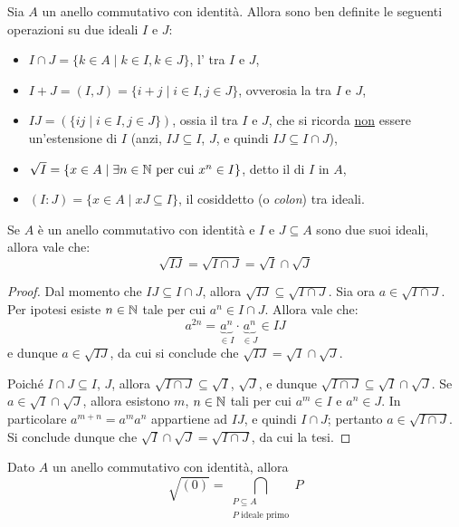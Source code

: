 \documentclass[11pt]{scrartcl}
\begin{document}
	Sia $A$ un anello commutativo con identità. Allora sono ben definite le
	seguenti operazioni su due ideali $I$ e $J$:
	\begin{itemize}
		\item $I\cap J = \{k \in A \mid k \in I, k \in J\}$, l' tra
		$I$ e $J$,
		\item $I + J = (I, J) = \{i + j \mid i \in I, j \in J\}$, ovverosia la  tra $I$ e $J$,
		\item $IJ = (\{ij\mid i \in I, j \in J\})$, ossia il  tra $I$ e $J$, che si ricorda \underline{non} essere
		un'estensione di $I$ (anzi, $IJ \subseteq I$, $J$, e quindi $IJ \subseteq I \cap J$),
		\item $\sqrt{I} = \{x \in A \mid \exists n \in \mathbb N \text{ per cui } x^n \in I\}$,
		detto il  di $I$ in $A$,
		\item $(I : J) = \{x \in A \mid xJ \subseteq I\}$, il cosiddetto  (o \textit{colon}) tra ideali.
	\end{itemize}
	
	\begin{proposition}
		Se $A$ è un anello commutativo con identità e $I$ e $J \subseteq A$ sono due suoi ideali,
		allora vale che:
		\[
		\sqrt{IJ} = \sqrt{I\cap J} = \sqrt{I}\cap \sqrt{J}
		\]
	\end{proposition}
	
	\begin{proof}
		Dal momento che $IJ \subseteq I \cap J$, allora $\sqrt{IJ} \subseteq \sqrt{I \cap J}$. Sia ora $a \in \sqrt{I \cap J}$. Per ipotesi esiste $n \in \mathbb N$ tale
		per cui $a^n \in I \cap J$. Allora vale che:
		\[
		a^{2n} = \underbrace{a^n}_{\in I} \cdot \underbrace{a^n}_{\in J}
		\in IJ
		\]
		e dunque $a \in \sqrt{IJ}$, da cui si conclude che $\sqrt{IJ} = \sqrt{I} \cap \sqrt{J}$. \medskip
		
		
		Poiché $I \cap J \subseteq I$, $J$, allora $\sqrt{I \cap J} \subseteq \sqrt{I}$,
		$\sqrt{J}$, e dunque $\sqrt{I \cap J} \subseteq \sqrt{I} \cap \sqrt{J}$. Se
		$a \in \sqrt{I} \cap \sqrt{J}$, allora esistono $m$, $n \in \mathbb N$ tali per
		cui $a^m \in I$ e $a^n \in J$. In particolare $a^{m+n} = a^m a^n$ appartiene
		ad $IJ$, e quindi $I \cap J$; pertanto $a \in \sqrt{I \cap J}$. Si conclude
		dunque che $\sqrt{I} \cap \sqrt{J} = \sqrt{I \cap J}$, da cui la tesi.
	\end{proof}
	
	\begin{proposition}
		\label{prop2.9}
		Dato $A$ un anello commutativo con identità, allora
		\[
		\sqrt{(0)} = \bigcap_{\substack{P\subseteq A\\ P \text{ ideale primo}}}P
		\]
	\end{proposition}
	
\end{document}
